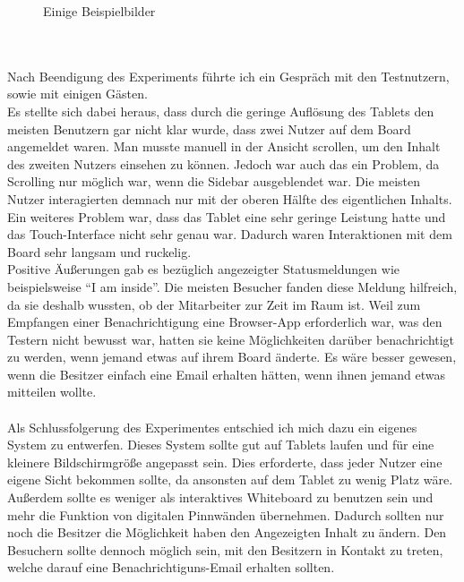 \begin{figure}[h!]
{      \label{img:experiment04}
    }
  \caption{Einige Beispielbilder}
\end{figure}
\\
\\
Nach Beendigung des Experiments führte ich ein Gespräch mit den Testnutzern, sowie mit einigen Gästen.\\
Es stellte sich dabei heraus, dass durch die geringe Auflösung des Tablets den meisten Benutzern gar nicht klar wurde, dass zwei Nutzer auf dem Board angemeldet waren. Man musste manuell in der Ansicht scrollen, um den Inhalt des zweiten Nutzers einsehen zu können. Jedoch war auch das ein Problem, da Scrolling nur möglich war, wenn die Sidebar ausgeblendet war. Die meisten Nutzer interagierten demnach nur mit der oberen Hälfte des eigentlichen Inhalts.\\
Ein weiteres Problem war, dass das Tablet eine sehr geringe Leistung hatte und das Touch-Interface nicht sehr genau war. Dadurch waren Interaktionen mit dem Board sehr langsam und ruckelig.\\
Positive Äußerungen gab es bezüglich angezeigter Statusmeldungen wie beispielsweise ``I am inside''. Die meisten Besucher fanden diese Meldung hilfreich, da sie deshalb wussten, ob der Mitarbeiter zur Zeit im Raum ist.
Weil zum Empfangen einer Benachrichtigung eine Browser-App erforderlich war, was den Testern nicht bewusst war, hatten sie keine Möglichkeiten darüber benachrichtigt zu werden, wenn jemand etwas auf ihrem Board änderte. Es wäre besser gewesen, wenn die Besitzer einfach eine Email erhalten hätten, wenn ihnen jemand etwas mitteilen wollte.
\\
\\
Als Schlussfolgerung des Experimentes entschied ich mich dazu ein eigenes System zu entwerfen.
Dieses System sollte gut auf Tablets laufen und für eine kleinere Bildschirmgröße angepasst sein. Dies erforderte, dass jeder Nutzer eine eigene Sicht bekommen sollte, da ansonsten auf dem Tablet zu wenig Platz wäre. Außerdem sollte es weniger als interaktives Whiteboard zu benutzen sein und mehr die Funktion von digitalen Pinnwänden übernehmen. Dadurch sollten nur noch die Besitzer die Möglichkeit haben den Angezeigten Inhalt zu ändern. Den Besuchern sollte dennoch möglich sein, mit den Besitzern in Kontakt zu treten, welche darauf eine Benachrichtiguns-Email erhalten sollten.